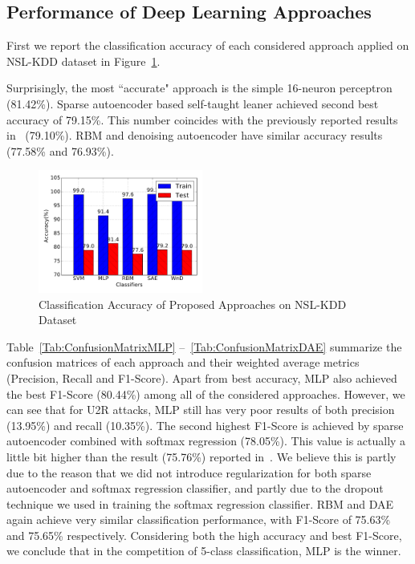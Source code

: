 \subsection{Performance of Deep Learning Approaches}
First we report the classification accuracy of each considered approach
applied on NSL-KDD dataset in Figure~\ref{Fig:CompAccuracy}.

Surprisingly, the most ``accurate" approach is the simple 16-neuron perceptron (81.42\%).
Sparse autoencoder based self-taught leaner achieved second best accuracy of 79.15\%.
This number coincides with the previously reported results in~\cite{STL-NIDS} (79.10\%).
RBM and denoising autoencoder have similar accuracy results (77.58\% and 76.93\%).

\begin{figure}[h]
    \centering
    \includegraphics[width=0.48\textwidth]{figures/comp_accuracy.pdf}
    \caption{Classification Accuracy of Proposed Approaches on NSL-KDD Dataset}
    \label{Fig:CompAccuracy}
\end{figure}

Table~\ref{Tab:ConfusionMatrixMLP} --~\ref{Tab:ConfusionMatrixDAE} summarize the confusion matrices
of each approach and their weighted average metrics (Precision, Recall and F1-Score).
Apart from best accuracy, MLP also achieved the best F1-Score (80.44\%)
among all of the considered approaches.
However, we can see that for U2R attacks, MLP still has very poor results of
both precision (13.95\%) and recall (10.35\%).
The second highest F1-Score is achieved by sparse autoencoder combined with softmax regression (78.05\%).
This value is actually a little bit higher than the result (75.76\%) reported in~\cite{STL-NIDS}.
We believe this is partly due to the reason that we did not introduce regularization
for both sparse autoencoder and softmax regression classifier,
and partly due to the dropout technique we used in training the softmax regression classifier.
RBM and DAE again achieve very similar classification performance,
with F1-Score of 75.63\% and 75.65\% respectively.
Considering both the high accuracy and best F1-Score, we conclude that in the competition of
5-class classification, MLP is the winner.

